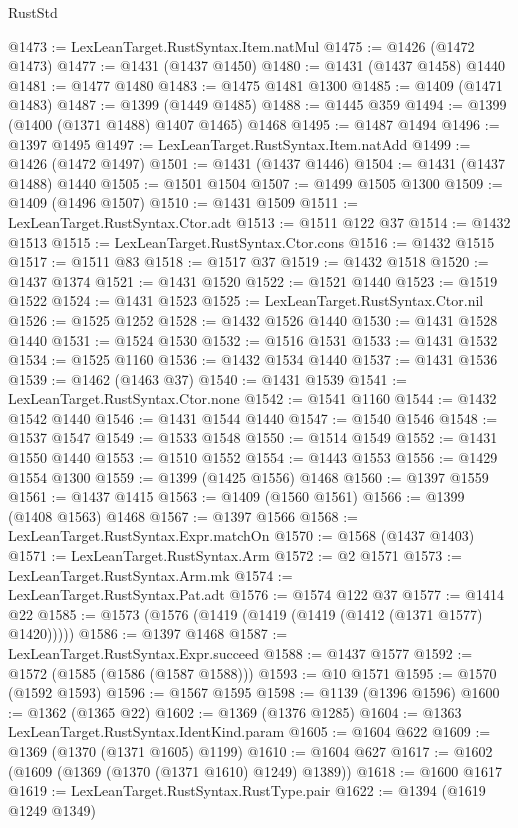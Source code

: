 \begin{lexlean}{RustStd}
\begin{coremodule}
@1473 := LexLeanTarget.RustSyntax.Item.natMul
@1475 := @1426 (@1472 @1473)
@1477 := @1431 (@1437 @1450)
@1480 := @1431 (@1437 @1458) @1440
@1481 := @1477 @1480
@1483 := @1475 @1481 @1300
@1485 := @1409 (@1471 @1483)
@1487 := @1399 (@1449 @1485)
@1488 := @1445 @359
@1494 := @1399 (@1400 (@1371 @1488) @1407 @1465) @1468
@1495 := @1487 @1494
@1496 := @1397 @1495
@1497 := LexLeanTarget.RustSyntax.Item.natAdd
@1499 := @1426 (@1472 @1497)
@1501 := @1431 (@1437 @1446)
@1504 := @1431 (@1437 @1488) @1440
@1505 := @1501 @1504
@1507 := @1499 @1505 @1300
@1509 := @1409 (@1496 @1507)
@1510 := @1431 @1509
@1511 := LexLeanTarget.RustSyntax.Ctor.adt
@1513 := @1511 @122 @37
@1514 := @1432 @1513
@1515 := LexLeanTarget.RustSyntax.Ctor.cons
@1516 := @1432 @1515
@1517 := @1511 @83
@1518 := @1517 @37
@1519 := @1432 @1518
@1520 := @1437 @1374
@1521 := @1431 @1520
@1522 := @1521 @1440
@1523 := @1519 @1522
@1524 := @1431 @1523
@1525 := LexLeanTarget.RustSyntax.Ctor.nil
@1526 := @1525 @1252
@1528 := @1432 @1526 @1440
@1530 := @1431 @1528 @1440
@1531 := @1524 @1530
@1532 := @1516 @1531
@1533 := @1431 @1532
@1534 := @1525 @1160
@1536 := @1432 @1534 @1440
@1537 := @1431 @1536
@1539 := @1462 (@1463 @37)
@1540 := @1431 @1539
@1541 := LexLeanTarget.RustSyntax.Ctor.none
@1542 := @1541 @1160
@1544 := @1432 @1542 @1440
@1546 := @1431 @1544 @1440
@1547 := @1540 @1546
@1548 := @1537 @1547
@1549 := @1533 @1548
@1550 := @1514 @1549
@1552 := @1431 @1550 @1440
@1553 := @1510 @1552
@1554 := @1443 @1553
@1556 := @1429 @1554 @1300
@1559 := @1399 (@1425 @1556) @1468
@1560 := @1397 @1559
@1561 := @1437 @1415
@1563 := @1409 (@1560 @1561)
@1566 := @1399 (@1408 @1563) @1468
@1567 := @1397 @1566
@1568 := LexLeanTarget.RustSyntax.Expr.matchOn
@1570 := @1568 (@1437 @1403)
@1571 := LexLeanTarget.RustSyntax.Arm
@1572 := @2 @1571
@1573 := LexLeanTarget.RustSyntax.Arm.mk
@1574 := LexLeanTarget.RustSyntax.Pat.adt
@1576 := @1574 @122 @37
@1577 := @1414 @22
@1585 := @1573 (@1576 (@1419 (@1419 (@1419 (@1412 (@1371 @1577) @1420)))))
@1586 := @1397 @1468
@1587 := LexLeanTarget.RustSyntax.Expr.succeed
@1588 := @1437 @1577
@1592 := @1572 (@1585 (@1586 (@1587 @1588)))
@1593 := @10 @1571
@1595 := @1570 (@1592 @1593)
@1596 := @1567 @1595
@1598 := @1139 (@1396 @1596)
@1600 := @1362 (@1365 @22)
@1602 := @1369 (@1376 @1285)
@1604 := @1363 LexLeanTarget.RustSyntax.IdentKind.param
@1605 := @1604 @622
@1609 := @1369 (@1370 (@1371 @1605) @1199)
@1610 := @1604 @627
@1617 := @1602 (@1609 (@1369 (@1370 (@1371 @1610) @1249) @1389))
@1618 := @1600 @1617
@1619 := LexLeanTarget.RustSyntax.RustType.pair
@1622 := @1394 (@1619 @1249 @1349)

\end{coremodule}
\end{lexlean}
